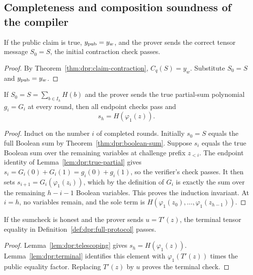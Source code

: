 \subsection{Completeness and composition soundness of the compiler}\label{sec:dpr:security}

\begin{lemma}\label{lem:dpr:init-honest}
If the public claim is true,
$y_{\rm pub}=y_w$, and the prover
sends the correct tensor message
$S_0=S$, the initial contraction
check passes.
\end{lemma}
\begin{proof}
By Theorem~\ref{thm:dpr:claim-contraction},
$C_q(S)=y_w$. Substitute
$S_0=S$ and
$y_{\rm pub}=y_w$.
\end{proof}

\begin{lemma}\label{lem:dpr:telescoping}
If $S_0=S=\sum_{b\in I_h}H(b)$
and the prover sends the true
partial-sum polynomial $g_i=G_i$
at every round, then all endpoint
checks pass and
\[
 s_h=H(\varphi_1(z)).
\]
\end{lemma}
\begin{proof}
Induct on the number $i$ of
completed rounds. Initially
$s_0=S$ equals the full Boolean
sum by Theorem~\ref{thm:dpr:boolean-sum}.
Suppose $s_i$ equals the true
Boolean sum over the remaining
variables at challenge prefix
$z_{<i}$. The endpoint identity
of Lemma~\ref{lem:dpr:true-partial}
gives
$s_i=G_i(0)+G_i(1)=g_i(0)+g_i(1)$,
so the verifier's check passes.
It then sets
$s_{i+1}=G_i(\varphi_1(z_i))$,
which by the definition of $G_i$
is exactly the sum over the
remaining $h-i-1$ Boolean variables.
This proves the induction invariant.
At $i=h$, no variables remain,
and the sole term is
$H(\varphi_1(z_0),\ldots,
\varphi_1(z_{h-1}))$.
\end{proof}

\begin{lemma}\label{lem:dpr:terminal-honest}
If the sumcheck is honest and
the prover sends $u=T'(z)$,
the terminal tensor equality
in Definition~\ref{def:dpr:full-protocol}
passes.
\end{lemma}
\begin{proof}
Lemma~\ref{lem:dpr:telescoping}
gives $s_h=H(\varphi_1(z))$.
Lemma~\ref{lem:dpr:terminal}
identifies this element with
$\varphi_1(T'(z))$
times the public equality factor.
Replacing $T'(z)$ by $u$
proves the terminal check.
\end{proof}

